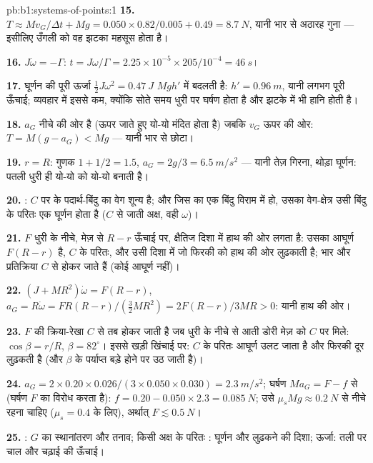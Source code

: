 \begin{solution}{pb:b1:systems-of-points:1}
\textbf{15.} $T \approx Mv_G/\Delta t + Mg = 0.050 \times 0.82/0.005 + 0.49 =
\qty{8.7}{N}$, यानी भार से अठारह गुना --- इसीलिए उँगली को वह झटका महसूस
होता है।

\textbf{16.} $J\dot\omega = -\Gamma$: $t = J\omega/\Gamma = 2.25\times10^{-5} \times
205/10^{-4} = \qty{46}{s}$।

\textbf{17.} घूर्णन की पूरी ऊर्जा $\tfrac12 J\omega^2 = \qty{0.47}{J}$
$Mgh'$ में बदलती है: $h' = \qty{0.96}{m}$, यानी लगभग पूरी ऊँचाई; व्यवहार
में इससे कम, क्योंकि सोते समय धुरी पर घर्षण होता है और झटके में भी हानि
होती है।

\textbf{18.} $a_G$ नीचे की ओर है (ऊपर जाते हुए यो-यो मंदित होता है) जबकि
$v_G$ ऊपर की ओर: $T = M(g - a_G) < Mg$ --- यानी भार से छोटा।

\textbf{19.} $r = R$: गुणक $1 + 1/2 = 1.5$, $a_G = 2g/3 = \qty{6.5}{m/s^2}$
--- यानी तेज़ गिरना, थोड़ा घूर्णन: पतली धुरी ही यो-यो को यो-यो बनाती है।

\textbf{20.} : $C$ पर के पदार्थ-बिंदु का वेग शून्य है;
और जिस  का एक बिंदु विराम में हो, उसका वेग-क्षेत्र उसी बिंदु के
परितः एक घूर्णन होता है ($C$ से जाती अक्ष, वही $\omega$)।

\textbf{21.} $F$ धुरी के नीचे, मेज़ से $R - r$ ऊँचाई पर, क्षैतिज दिशा में
हाथ की ओर लगता है: उसका आघूर्ण $F(R - r)$ है, $C$ के परितः, और उसी दिशा में
जो फिरकी को हाथ की ओर लुढ़काती है; भार और प्रतिक्रिया $C$ से होकर जाते हैं
(कोई आघूर्ण नहीं)।

\textbf{22.} $(J + MR^2)\dot\omega = F(R - r)$, $a_G = R\dot\omega = FR(R - r)/
(\tfrac32 MR^2) = 2F(R - r)/3MR > 0$: यानी हाथ की ओर।

\textbf{23.} $F$ की क्रिया-रेखा $C$ से तब होकर जाती है जब धुरी के नीचे से
आती डोरी मेज़ को $C$ पर मिले: $\cos\beta = r/R$,
$\beta = 82^\circ$। इससे खड़ी खिंचाई पर: $C$ के परितः आघूर्ण उलट जाता है और फिरकी
दूर लुढ़कती है (और $\beta$ के पर्याप्त बड़े होने पर उठ जाती है)।

\textbf{24.} $a_G = 2 \times 0.20 \times 0.026/(3 \times 0.050 \times 0.030) =
\qty{2.3}{m/s^2}$; घर्षण $Ma_G = F - f$ से (घर्षण $F$ का विरोध करता है):
$f = 0.20 - 0.050 \times 2.3 = \qty{0.085}{N}$; उसे $\mu_sMg
\approx \qty{0.2}{N}$ से नीचे रहना चाहिए ($\mu_s = 0.4$ के लिए), अर्थात् $F \lesssim \qty{0.5}{N}$।

\textbf{25.} : $G$ का स्थानांतरण और तनाव; किसी अक्ष के
परितः : घूर्णन और लुढ़कने की दिशा; ऊर्जा: तली पर चाल और चढ़ाई
की ऊँचाई।
\end{solution}
